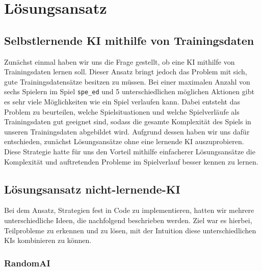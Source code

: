 \chapter{Lösungsansatz}
\label{ch:loesungsansatz}



\section{Selbstlernende KI mithilfe von Trainingsdaten}
\label{sec:selbstlernende-ki-trainingsdaten}

Zunächst einmal haben wir uns die Frage gestellt, ob eine \acs{KI} mithilfe von Trainingsdaten lernen soll.
Dieser Ansatz bringt jedoch das Problem mit sich, gute Trainingsdatensätze besitzen zu müssen.
Bei einer maximalen Anzahl von sechs Spielern im Spiel \texttt{spe\_ed} und 5 unterschiedlichen möglichen Aktionen gibt
es sehr viele Möglichkeiten wie ein Spiel verlaufen kann.
Dabei entsteht das Problem zu beurteilen, welche Spielsituationen und welche Spielverläufe als Trainingsdaten gut
geeignet sind, sodass die gesamte Komplexität des Spiels in unseren Trainingsdaten abgebildet wird.
Aufgrund dessen haben wir uns dafür entschieden, zunächst Lösungsansätze ohne eine lernende \acs{KI} auszuprobieren.
Diese Strategie hatte für uns den Vorteil mithilfe einfacherer Lösungsansätze die Komplexität und auftretenden Probleme
im Spielverlauf besser kennen zu lernen. 


\section{Lösungsansatz nicht-lernende-KI}
\label{sec:loesungsansatz-nicht-lernende-KI}

Bei dem Ansatz, Strategien fest in Code zu implementieren, hatten wir mehrere unterschiedliche Ideen,
die nachfolgend beschrieben werden.
Ziel war es hierbei, Teilprobleme zu erkennen und zu lösen, mit der Intuition diese unterschiedlichen \acs{KI}s
kombinieren zu können.


\subsection{RandomAI}
\label{sec:random-ai}

